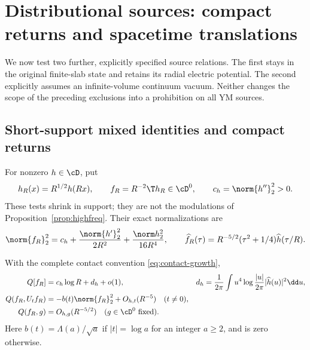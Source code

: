\section{Distributional sources: compact returns and spacetime translations}
\label{sec:distributional}
We now test two further, explicitly specified source relations.
The first stays in the original finite-slab state and retains its
radial electric potential. The second explicitly assumes an
infinite-volume continuum vacuum. Neither changes the scope of
the preceding exclusions into a prohibition on all YM sources.

\subsection{Short-support mixed identities and compact returns}
For nonzero $h\in\cD$, put
\begin{equation}\label{eq:shrinking-test}
h_R(x)=R^{1/2}h(Rx),\qquad f_R=R^{-2}\T h_R\in\cD^0,
\qquad c_h=\norm{h''}_2^2>0.
\end{equation}
These tests shrink in support; they are not the modulations
of Proposition~\ref{prop:highfreq}. Their exact normalizations are
\begin{equation}
\norm{f_R}_2^2=c_h+\frac{\norm{h'}_2^2}{2R^2}
 +\frac{\norm h_2^2}{16R^4},\qquad
\widehat f_R(\tau)=R^{-5/2}(\tau^2+1/4)\widehat h(\tau/R).
\end{equation}
\begin{lemma}\label{lem:shrinking}
With the complete contact convention \eqref{eq:contact-growth},
\begin{align}
Q[f_R]&=c_h\log R+d_h+o(1),&
d_h&=\frac1{2\pi}\int u^4\log\frac{|u|}{2\pi}
                         |\widehat h(u)|^2\dd u,\label{eq:shrinking-diag}\\
Q(f_R,U_tf_R)&=-b(t)\norm{f_R}_2^2+O_{h,t}(R^{-5})
\quad(t\ne0),\label{eq:shrinking-off}\\
Q(f_R,g)&=O_{h,g}(R^{-5/2})\quad(g\in\cD^0\ \hbox{fixed}).
\label{eq:shrinking-weak}
\end{align}
Here $b(t)=\Lambda(a)/\sqrt a$ if $|t|=\log a$ for an integer
$a\ge2$, and is zero otherwise.
\end{lemma}
